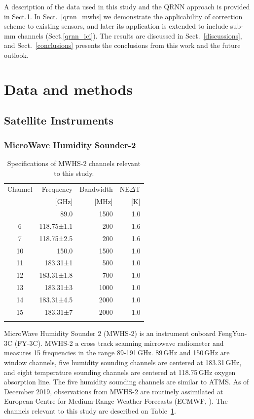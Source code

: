 \documentclass[amt, manuscript]{copernicus}
\begin{document}
A description of the data used in this study and the QRNN approach is provided
in Sect.\ref{data_methods}. In Sect.~\ref{qrnn_mwhs} we demonstrate the
applicability of correction scheme to existing sensors, and later its
application is extended to include sub-mm channels (Sect.\ref{qrnn_ici}). The
results are discussed in Sect.~\ref{discussions}, and Sect.~\ref{conclusions}
presents the conclusions from this work and the future outlook.


\section{Data and methods}
\label{data_methods}
%
\subsection{Satellite Instruments}
%
\subsubsection{ MicroWave Humidity Sounder-2}
%
\begin{table}[t]
	\caption{Specifications of MWHS-2 channels relevant to this study.}
	\label{tab:specifications_MWHS2}	
	\begin{tabular}{crrr}
		\tophline
		Channel & Frequency 	& Bandwidth & NE$\Delta$T \\
		& [GHz]			& [MHz]		& [K]		\\
		\middlehline
		1	&	89.0   		  & 1500			&	1.0	\\
		6	&	118.75±1.1    & \phantom{0}200 	&	1.6\\
		7	&	118.75±2.5    & \phantom{0}200 	&	1.6\\
		10	&	150.0         & 1500 			&	1.0 \\
		11	&	183.31±1      & \phantom{0}500  &	1.0 \\
		12  & 	183.31±1.8    & \phantom{0}700 	&   1.0\\
		13  & 	183.31±3      & 1000    		&	1.0	\\
		14  & 	183.31±4.5    & 2000    		&	1.0\\
		15  & 	183.31±7      & 2000  			&	1.0  \\
		\bottomhline
	\end{tabular}
	\belowtable{} %
\end{table}
MicroWave Humidity Sounder 2 (MWHS-2) is an instrument onboard FengYun-3C (FY-3C). MWHS-2 a cross track scanning microwave radiometer and measures 15 frequencies in the range 89-191\,GHz. 89\,GHz and 150\,GHz are window channels, five humidity sounding channels are centered at 183.31\,GHz, and eight temperature sounding channels are centered at 118.75\,GHz oxygen absorption line. The five humidity sounding channels are similar to ATMS. As of December 2019, observations from MWHS-2 are routinely assimilated at European Centre for Medium-Range Weather Forecasts (ECMWF, \citet{duncan2020MWHS}). The channels relevant to this study are described on Table~\ref{tab:specifications_MWHS2}. 
\end{document}
